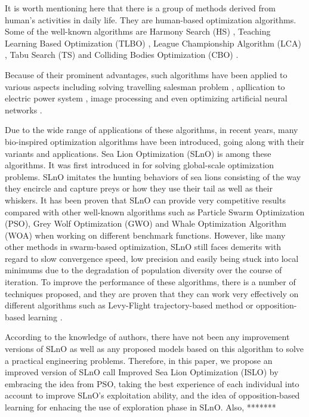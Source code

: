 \documentclass[a4paper,13pt,2p]{report}
\begin{document}
	It is worth mentioning here that there is a group of methods derived from human's activities in daily life. They are human-based optimization algorithms. Some of the well-known algorithms are Harmony Search (HS) \cite{geem2001new}, Teaching Learning Based Optimization (TLBO) \cite{ao2011teaching}, League Championship Algorithm (LCA) \cite{kashan2014league}, Tabu Search (TS) \cite{de1989tabu} and Colliding Bodies Optimization (CBO) \cite{kaveh2014colliding}.
	
	Because of their prominent advantages, such algorithms have been applied to various aspects including solving travelling salesman problem \cite{wang2003particle}, apllication to electric power system \cite{yuan2004survey}, image processing \cite{karmakar2002generic} \cite{hore2011edge} and even optimizing artificial neural networks \cite{bhesdadiya2016training} \cite{matias2014learning}. 
	
	Due to the wide range of applications of these algorithms, in recent years, many bio-inspired optimization algorithms have been introduced, going along with their variants and applications. Sea Lion Optimization (SLnO) is among these algorithms. It was first introduced in \cite{masadeh2019sea} for solving global-scale optimization problems. SLnO imitates the hunting behaviors of sea lions consisting of the way they encircle and capture preys or how they use their tail as well as their whiskers. It has been proven that SLnO can provide very competitive results compared with other well-known algorithms such as Particle Swarm Optimization (PSO), Grey Wolf Optimization (GWO) and Whale Optimization Algorithm (WOA) when working on different benchmark functions. However, like many other methods in swarm-based optimization, SLnO still faces demerits with regard to slow convergence speed, low precision and easily being stuck into local minimums due to the degradation of population diversity over the course of iteration. To improve the performance of these algorithms, there is a number of techniques proposed, and they are proven that they can work very effectively on different algorithms such as Levy-Flight trajectory-based method \cite{chawla2018levy} or opposition-based learning \cite{wang2011enhanced} \cite{omran2010improving} \cite{wang2016opposition}. 
	
	According to the knowledge of authors, there have not been any improvement versions of SLnO as well as any proposed models based on this algorithm to solve a practical engineering problems. Therefore, in this paper, we propose an improved version of SLnO call Improved Sea Lion Optimization (ISLO) by embracing the idea from PSO, taking the best experience of each individual into account to improve SLnO's exploitation ability, and the idea of opposition-based learning for enhacing the use of exploration phase in SLnO. Also, *******
	
\end{document}
